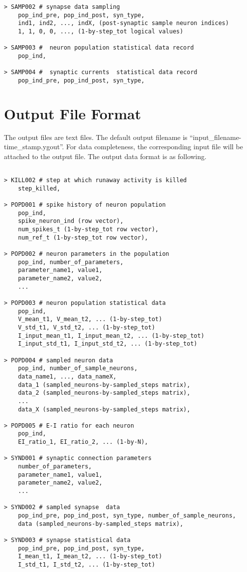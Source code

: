 \documentclass{article}
\begin{document}
\begin{lstlisting}[mathescape]
> SAMP002 # synapse data sampling 
	pop_ind_pre, pop_ind_post, syn_type,
	ind1, ind2, ..., indX, (post-synaptic sample neuron indices)
	1, 1, 0, 0, ..., (1-by-step_tot logical values)
	
> SAMP003 #  neuron population statistical data record
	pop_ind,
	
> SAMP004 #  synaptic currents  statistical data record
	pop_ind_pre, pop_ind_post, syn_type,

\end{lstlisting}

\section{Output File Format}
The output files are text files.
The default output filename is ``input\_filename-time\_stamp.ygout''.
For data completeness, the corresponding input file will be attached to the output file.
The output data format is as following.
\begin{lstlisting}

> KILL002 # step at which runaway activity is killed
	step_killed,

> POPD001 # spike history of neuron population
	pop_ind,
	spike_neuron_ind (row vector),
	num_spikes_t (1-by-step_tot row vector),
	num_ref_t (1-by-step_tot row vector),

> POPD002 # neuron parameters in the population
	pop_ind, number_of_parameters,
	parameter_name1, value1,
	parameter_name2, value2,
	...

> POPD003 # neuron population statistical data
	pop_ind,
	V_mean_t1, V_mean_t2, ... (1-by-step_tot)
	V_std_t1, V_std_t2, ... (1-by-step_tot)
	I_input_mean_t1, I_input_mean_t2, ... (1-by-step_tot)
	I_input_std_t1, I_input_std_t2, ... (1-by-step_tot)
	
> POPD004 # sampled neuron data
	pop_ind, number_of_sample_neurons,
	data_name1, ..., data_nameX,
	data_1 (sampled_neurons-by-sampled_steps matrix),
	data_2 (sampled_neurons-by-sampled_steps matrix),
	...
	data_X (sampled_neurons-by-sampled_steps matrix),

> POPD005 # E-I ratio for each neuron
	pop_ind,
	EI_ratio_1, EI_ratio_2, ... (1-by-N),

> SYND001 # synaptic connection parameters
	number_of_parameters,
	parameter_name1, value1,
	parameter_name2, value2,
	...

> SYND002 # sampled synapse  data
	pop_ind_pre, pop_ind_post, syn_type, number_of_sample_neurons,
	data (sampled_neurons-by-sampled_steps matrix),

> SYND003 # synapse statistical data
	pop_ind_pre, pop_ind_post, syn_type,
	I_mean_t1, I_mean_t2, ... (1-by-step_tot)
	I_std_t1, I_std_t2, ... (1-by-step_tot)
	
	

\end{lstlisting}

{}

\end{document}

